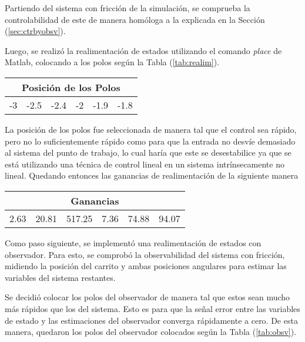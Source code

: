 %
%



Partiendo del sistema con fricción de la simulación, se comprueba la controlabilidad de este de manera homóloga a la explicada en la Sección (\ref{sec:ctrbyobsv}). 




Luego, se realizó la realimentación de estados utilizando el comando \textit{place} de Matlab, colocando a los polos según la Tabla (\ref{tab:realim}).

\begin{table}[H]
\centering
\begin{tabular}{@{}cccccc@{}}
\toprule
\multicolumn{6}{c}{Posición de los Polos} \\ \midrule
-3   & -2.5   & -2.4  & -2  & -1.9  & -1.8  \\ \bottomrule
\end{tabular}
\end{table}
\label{tab:realim}

La posición de los polos fue seleccionada de manera tal que el control sea rápido, pero no lo suficientemente rápido como para que la entrada no desvíe demasiado al sistema del punto de trabajo, lo cual haría que este se desestabilice ya que se está utilizando una técnica de control lineal en un sistema intrínsecamente no lineal.
Quedando entonces las ganancias de realimentación de la siguiente manera

\begin{table}[H]
\centering
\begin{tabular}{@{}cccccc@{}}
\toprule
\multicolumn{6}{c}{Ganancias}                    \\ \midrule
2.63 & 20.81 & 517.25 & 7.36 & 74.88 & 94.07 \\ \bottomrule
\end{tabular}
\end{table}


Como paso siguiente, se implementó una realimentación de estados con observador. Para esto, se comprobó la observabilidad del sistema con fricción, midiendo la posición del carrito y ambas posiciones angulares para estimar las variables del sistema restantes.

Se decidió colocar los polos del observador de manera tal que estos sean mucho más rápidos que los del sistema. Esto es para que la señal error entre las variables de estado y las estimaciones del observador converga rápidamente a cero. De esta manera, quedaron los polos del observador colocados según la Tabla (\ref{tab:obsv}).

